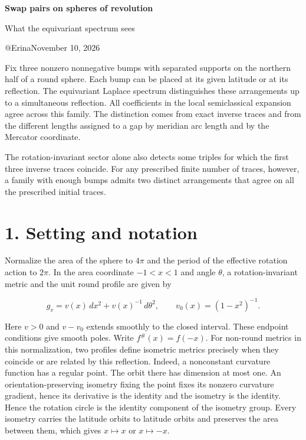 \documentclass[11pt,letterpaper]{article}
\begin{document}
{\LARGE\bfseries Swap pairs on spheres of revolution\par}
{\Large What the equivariant spectrum sees\par}
{\small @Erina\hfill November 10, 2026\par}
\medskip

Fix three nonzero nonnegative bumps with separated supports on the northern half of a round
sphere. Each bump can be placed at its given latitude or at its reflection. The equivariant
Laplace spectrum distinguishes these arrangements up to a simultaneous reflection. All
coefficients in the local semiclassical expansion agree across this family. The distinction
comes from exact inverse traces and from the different lengths assigned to a gap by meridian
arc length and by the Mercator coordinate.

The rotation-invariant sector alone also detects some triples for which the first three
inverse traces coincide. For any prescribed finite number of traces, however, a family with
enough bumps admits two distinct arrangements that agree on all the prescribed initial
traces.

\section{1. Setting and notation}\label{setting-and-notation}

Normalize the area of the sphere to \(4\pi\) and the period of the effective rotation action
to \(2\pi\). In the area coordinate \(-1<x<1\) and angle \(\theta\), a rotation-invariant
metric and the unit round profile are given by

\[g_v=v(x)\,dx^2+v(x)^{-1}\,d\theta^2,\qquad v_0(x)=(1-x^2)^{-1}.\]

Here \(v>0\) and \(v-v_0\) extends smoothly to the closed interval. These endpoint
conditions give smooth poles. Write \(f^\#(x)=f(-x)\). For non-round metrics in this
normalization, two profiles define isometric metrics precisely when they coincide or are
related by this reflection. Indeed, a nonconstant curvature function has a regular point.
The orbit there has dimension at most one. An orientation-preserving isometry fixing the
point fixes its nonzero curvature gradient, hence its derivative is the identity and the
isometry is the identity. Hence the rotation circle is the identity component of the
isometry group. Every isometry carries the latitude orbits to latitude orbits and preserves
the area between them, which gives \(x\mapsto x\) or \(x\mapsto -x\).
\end{document}
